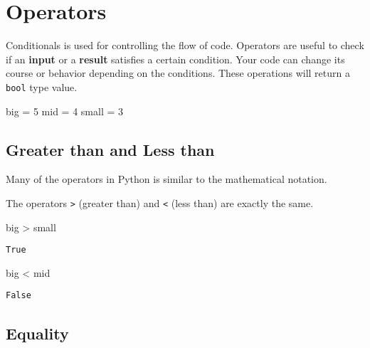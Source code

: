 \documentclass[
  letterpaper,
  DIV=11,
  numbers=noendperiod]{scrreprt}
\newenvironment{Shaded}{\begin{snugshade}}{\end{snugshade}}
\newcommand{\DecValTok}[1]{\textcolor[rgb]{0.68,0.00,0.00}{#1}}
\newcommand{\NormalTok}[1]{\textcolor[rgb]{0.00,0.23,0.31}{#1}}
\newcommand{\OperatorTok}[1]{\textcolor[rgb]{0.37,0.37,0.37}{#1}}
\begin{document}
\chapter{Operators}\label{operators}

Conditionals is used for controlling the flow of code. Operators are
useful to check if an \textbf{input} or a \textbf{result} satisfies a
certain condition. Your code can change its course or behavior depending
on the conditions. These operations will return a \texttt{bool} type
value.

\begin{Shaded}
\begin{Highlighting}[]
\NormalTok{big }\OperatorTok{=} \DecValTok{5}
\NormalTok{mid }\OperatorTok{=} \DecValTok{4}
\NormalTok{small }\OperatorTok{=} \DecValTok{3}
\end{Highlighting}
\end{Shaded}

\section{Greater than and Less than}\label{greater-than-and-less-than}

Many of the operators in Python is similar to the mathematical notation.

The operators \texttt{\textgreater{}} (greater than) and
\texttt{\textless{}} (less than) are exactly the same.

\begin{Shaded}
\begin{Highlighting}[]
\NormalTok{big }\OperatorTok{\textgreater{}}\NormalTok{ small}
\end{Highlighting}
\end{Shaded}

\begin{verbatim}
True
\end{verbatim}

\begin{Shaded}
\begin{Highlighting}[]
\NormalTok{big }\OperatorTok{\textless{}}\NormalTok{ mid}
\end{Highlighting}
\end{Shaded}

\begin{verbatim}
False
\end{verbatim}

\section{Equality}\label{equality}
\end{document}
